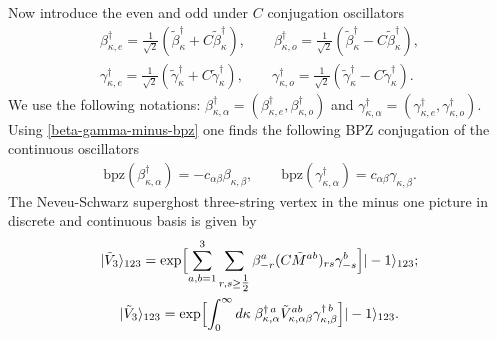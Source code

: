 \documentclass[a4paper,12pt]{article}
\begin{document}
Now introduce the even and odd under $C$ conjugation oscillators
\begin{subequations}
\begin{gather}
\beta^{\dag}_{\kappa,e}
=\frac{1}{\sqrt{2}}(
\tilde{\beta}^{\dag}_{\kappa}+C\tilde{\beta}^{\dag}_{\kappa}),\qquad
\beta^{\dag}_{\kappa,o}
=\frac{1}{\sqrt{2}}(
\tilde{\beta}^{\dag}_{\kappa}-C\tilde{\beta}^{\dag}_{\kappa}),\\
\gamma^{\dag}_{\kappa,e}
=\frac{1}{\sqrt{2}}(
\tilde{\gamma}^{\dag}_{\kappa}+C\tilde{\gamma}^{\dag}_{\kappa}),\qquad
\gamma^{\dag}_{\kappa,o}
=\frac{1}{\sqrt{2}}(
\tilde{\gamma}^{\dag}_{\kappa}-C\tilde{\gamma}^{\dag}_{\kappa}).
\end{gather}
\end{subequations}
We use the following
notations: $\beta_{\kappa,\alpha}^{\dag}=(\beta_{\kappa,e}^{\dag},\beta_{\kappa,o}^{\dag})$
and $\gamma_{\kappa,\alpha}^{\dag}=(\gamma_{\kappa,e}^{\dag},\gamma_{\kappa,o}^{\dag})$.
Using \eqref{beta-gamma-minus-bpz}
one finds the following BPZ conjugation
of the continuous oscillators
\begin{gather}
\text{bpz}(\beta^{\dag}_{\kappa,\alpha})=-c_{\alpha\beta}
\beta_{\kappa,\beta},\qquad
\text{bpz}(\gamma^{\dag}_{\kappa,\alpha})=c_{\alpha\beta}
\gamma_{\kappa,\beta}.
\end{gather}
The Neveu-Schwarz superghost three-string vertex in the minus one picture
in discrete and continuous basis is given by
\begin{gather}
|\tilde{V}_{3}\rangle_{123}
=\exp\Bigl[\sum_{a,b=1}^{3}\sum_{r,s\geq
\tfrac12} \beta_{-r}^{a}(C\tilde{M}^{ab})_{rs}\gamma^{b}_{-s}\Bigr]
|-1\rangle_{123};\\
|\tilde{V}_{3}\rangle_{123}
=\exp\Bigl[\int_{0}^{\infty}d\kappa\;
\beta_{\kappa,\alpha}^{\dag\,a}
\tilde{V}^{ab}_{\kappa,\alpha\beta}\gamma_{\kappa,\beta}^{\dag\,b}\Bigr]
|-1\rangle_{123}.
\label{diag-vert-ghost}
\end{gather}
\end{document}
